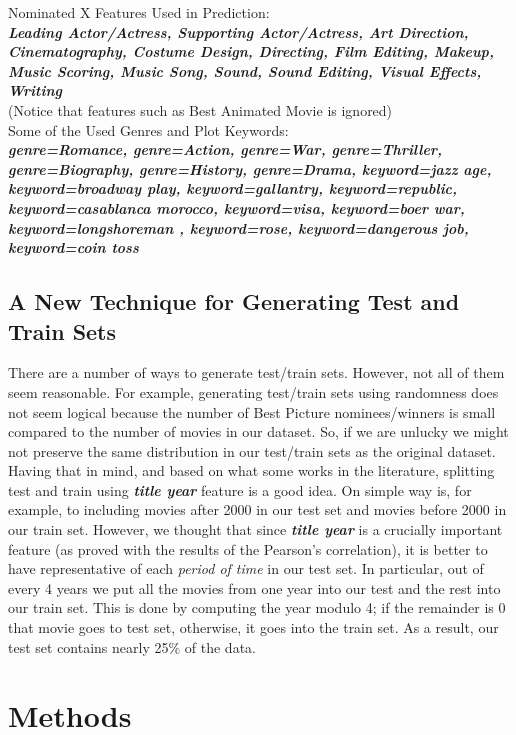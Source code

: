 \documentclass[journal,transmag]{IEEEtran}
\begin{document}
\noindent
Nominated X Features Used in Prediction:\\
\textit{\textbf{Leading Actor/Actress, Supporting	 Actor/Actress, Art Direction, Cinematography, Costume Design, Directing, Film Editing, Makeup,  Music Scoring, Music Song, Sound, Sound Editing, Visual Effects, Writing }}\\ 
(Notice that features such as Best Animated Movie is ignored)\\

\noindent
Some of the Used Genres and Plot Keywords:\\
\textit{\textbf{genre=Romance,	genre=Action,	genre=War,	genre=Thriller,	genre=Biography,	 genre=History,	genre=Drama, keyword=jazz age,	keyword=broadway play,	keyword=gallantry,	keyword=republic,	keyword=casablanca morocco,	keyword=visa,	keyword=boer war,	keyword=longshoreman	, keyword=rose, 	keyword=dangerous job,	keyword=coin toss}}

\subsection{A New Technique for Generating Test and Train Sets}
There are a number of ways to generate test/train sets. However, not all of them seem reasonable. For example, generating test/train sets using randomness does not seem logical because the number of Best Picture nominees/winners is small compared to the number of movies in our dataset. So, if we are unlucky we might not preserve the same distribution in our test/train sets as the original dataset. \\
Having that in mind, and based on what some works in the literature, splitting test and train using \textbf{\textit{title year}} feature is a good idea. On simple way is, for example, to including movies after 2000 in our test set and movies before 2000 in our train set. However, we thought that since \textbf{\textit{title year}} is a crucially important feature (as proved with the results of the Pearson's correlation), it is better to have representative of each \textit{period of time} in our test set. In particular, out of every 4 years we put all the movies from one year into our test and the rest into our train set. This is done by computing the year modulo 4; if the remainder is 0 that movie goes to test set, otherwise, it goes into the train set. As a result, our test set contains nearly 25$\%$ of the data.


	
	
	\section{Methods}
	
\end{document}
